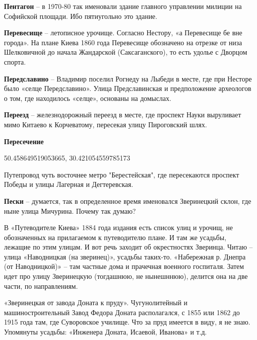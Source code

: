 \medskip

\textbf{Пентагон} – в 1970-80 так именовали здание главного управлении милиции на Софийской площади. Ибо пятиугольно это здание.\\

\medskip

\textbf{Перевесище} – летописное урочище. Согласно Нестору, «а Перевесище бе вне города». На плане Киева 1860 года Перевесище обозначено на отрезке от низа Шелковичной до начала Жандарской (Саксаганского), то есть удолье с Дворцом спорта.\\

\medskip

\textbf{Передславино} – Владимир поселил Рогнеду на Лыбеди в месте, где при Несторе было «селце Передславино». Улица Предславинская и предположение археологов о том, где находилось «селце», основаны на домыслах.\\

\medskip

\textbf{Переезд} – железнодорожный переезд в месте, где проспект Науки выруливает мимо Китаево к Корчеватому, пересекая улицу Пироговский шлях.\\

\medskip

\textbf{Пересечение}

50.458649519053665, 30.421054559785173

Путепровод  чуть восточнее метро "Берестейская", где пересекаются проспект Победы и улицы Лагерная и Дегтеревская.

\medskip

\textbf{Пески}  – думается, так в определенное время именовался Зверинецкий склон, где ныне улица Мичурина. Почему так думаю?

В «Путеводителе Киева» 1884 года издания есть список улиц и урочищ, не обозначенных на прилагаемом к путеводителю плане. И там же усадьбы, лежащие по этим улицам. И вот речь заходит об окрестностях Зверинца. Читаю – улица «Наводницкая (на зверинец)», усадьбы таких-то. «Набережная р. Днепра (от Наводницкой)» – там частные дома и прачечная военного госпиталя. Затем идет про улицу Зверинецкую (тогдашнюю, не нынешннюю), делится она на две части, по направлениям.

«Зверинецкая от завода Доната к пруду». Чугунолитейный и машиностроительный Завод Федора Доната располагался, с 1855 или 1862 до 1915 года там, где Суворовское училище. Что за пруд имеется в виду, я не знаю. Упомянуты усадьбы: «Инженера Доната, Исаевой, Иванова» и т.д.

